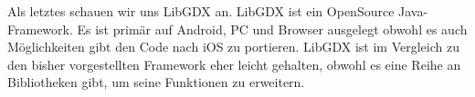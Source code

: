 Als letztes schauen wir uns LibGDX an. LibGDX ist ein OpenSource Java-Framework. Es ist primär auf Android, PC und Browser ausgelegt obwohl es auch Möglichkeiten gibt den Code nach iOS zu portieren. LibGDX ist im Vergleich zu den bisher vorgestellten Framework eher leicht gehalten, obwohl es eine Reihe an Bibliotheken gibt, um seine Funktionen zu erweitern.